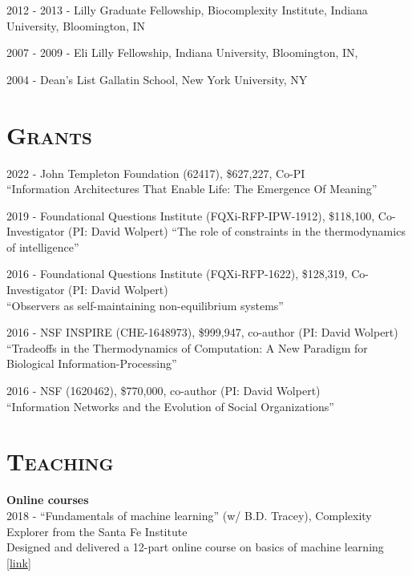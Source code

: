 \documentclass[margin,line,centered]{res}
\begin{document}
\begin{resume}
2012 - 2013 - Lilly Graduate Fellowship, Biocomplexity Institute, Indiana University, Bloomington, IN

2007 - 2009 - Eli Lilly Fellowship, Indiana University, Bloomington, IN, 

2004 - Dean's List Gallatin School, New York University, NY

\section{\textsc{Grants}}


2022 - John Templeton Foundation (62417), \$627,227, Co-PI\\
``Information Architectures That Enable Life: The Emergence Of Meaning''

2019 - Foundational Questions Institute (FQXi-RFP-IPW-1912),  \$118,100, Co-Investigator (PI: David Wolpert)
``The role of constraints in the thermodynamics of intelligence'' 

2016 - Foundational Questions Institute (FQXi-RFP-1622), \$128,319, Co-Investigator (PI: David Wolpert)\\
``Observers as self-maintaining non-equilibrium systems''

2016 - NSF INSPIRE (CHE-1648973), \$999,947, co-author (PI: David Wolpert)\\
``Tradeoffs in the Thermodynamics of Computation: A New Paradigm for Biological Information-Processing''

2016 - NSF (1620462), \$770,000, co-author (PI: David Wolpert)\\
``Information Networks and the Evolution of Social Organizations'' 



\section{\textsc{Teaching}}

\textbf{Online courses}\\
2018 - ``Fundamentals of machine learning'' (w/ B.D. Tracey), Complexity Explorer from the Santa Fe Institute\\
Designed and delivered a 12-part online course on basics of machine learning {[}\href{https://www.complexityexplorer.org/courses/81-fundamentals-of-machine-learning}{link}{]}


\end{resume}
\end{document}
